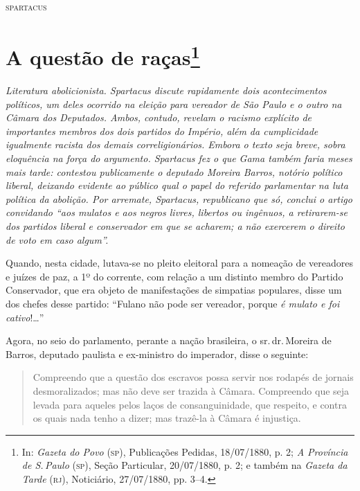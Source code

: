 \medskip
\hfill\textsc{spartacus}

\chapter{A questão de raças\footnote{In: \emph{Gazeta do Povo}
  (\textsc{sp}), Publicações Pedidas, 18/07/1880, p. 2; \emph{A Província de S.\,Paulo} (\textsc{sp}), Seção Particular, 20/07/1880, p. 2; e também na
  \emph{Gazeta da Tarde} (\textsc{rj}), Noticiário, 27/07/1880, pp. 3--4.}}

\begin{resumo}
\emph{Literatura abolicionista. Spartacus discute rapidamente
dois acontecimentos políticos, um deles ocorrido na eleição para
vereador de São Paulo e o outro na Câmara dos Deputados. Ambos, contudo,
revelam o racismo explícito de importantes membros dos dois partidos do
Império, além da cumplicidade igualmente racista dos demais
correligionários. Embora o texto seja breve, sobra eloquência na força
do argumento. Spartacus fez o que Gama também faria meses mais
tarde: contestou publicamente o deputado Moreira Barros, notório
político liberal, deixando evidente ao público qual o papel do referido
parlamentar na luta política da abolição. Por arremate,
Spartacus, republicano que só, conclui o artigo convidando ``aos
mulatos e aos negros livres, libertos ou ingênuos, a retirarem-se dos
partidos liberal e conservador em que se acharem; a não exercerem o
direito de voto em caso algum''.}
\end{resumo}


Quando, nesta cidade, lutava-se no pleito eleitoral para a nomeação de
vereadores e juízes de paz, a 1º do corrente, com relação a um distinto
membro do Partido Conservador, que era objeto de manifestações de
simpatias populares, disse um dos chefes desse partido: ``Fulano não pode
ser vereador, porque \emph{é mulato e foi cativo}!\ldots{}''

Agora, no seio do parlamento, perante a nação brasileira, o sr.\,dr.\,Moreira de Barros, deputado paulista e ex-ministro do imperador, disse o seguinte:

\begin{quote}
Compreendo que a questão dos escravos possa servir nos rodapés de
jornais desmoralizados; mas não deve ser trazida à Câmara. Compreendo
que seja levada para aqueles pelos laços de consanguinidade, que
respeito, e contra os quais nada tenho a dizer; mas trazê-la à Câmara é
injustiça.
\end{quote}

